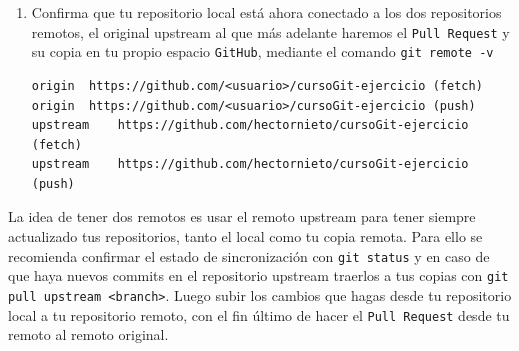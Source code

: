 \documentclass[a4paper,11pt]{report}
\newcommand{\cverb}{\Verb}
\begin{document}
\begin{enumerate}
   \hspace{-3cm}\cverb+git remote add <alias_del_remoto> https://github.com/hectornieto/cursoGit-ejercicio+
   
   Donde \cverb+<alias_del_remoto>+ podría ser cualquier nombre excepto \verb+origin+ ya que este alias ya está asignado al repositorio de tu cuenta. Un nombre común en estos casos suele ser \cverb+upstream+.
   
   \item Confirma que tu repositorio local está ahora conectado a los dos repositorios remotos, el original upstream al que más adelante haremos el \verb+Pull Request+ y su copia en tu propio espacio \verb+GitHub+, mediante el comando \cverb+git remote -v+
  
    \begin{lstlisting}[style=custom]   
origin	https://github.com/<usuario>/cursoGit-ejercicio (fetch)
origin	https://github.com/<usuario>/cursoGit-ejercicio (push)
upstream	https://github.com/hectornieto/cursoGit-ejercicio (fetch)
upstream	https://github.com/hectornieto/cursoGit-ejercicio (push)
    \end{lstlisting}
    \end{enumerate}
    
    La idea de tener dos remotos es usar el remoto upstream para tener siempre actualizado tus repositorios, tanto el  local como tu copia remota. Para ello se recomienda confirmar el estado de sincronización con \cverb+git status+ y en caso de que haya nuevos commits en el repositorio upstream traerlos a tus copias con \cverb+git pull upstream <branch>+. Luego subir los cambios que hagas desde tu repositorio local a tu repositorio remoto, con el fin último de hacer el \verb+Pull Request+ desde tu remoto al remoto original.
\end{document}
